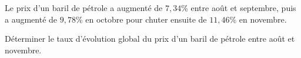\begin{exo}{}
	Le prix d'un baril de pétrole a augmenté de $7,34$\% entre août et septembre, puis a augmenté de $9,78$\% en octobre pour chuter ensuite de $11,46$\% en novembre.


	Déterminer le taux d'évolution global du prix d'un baril de pétrole entre août et novembre.
\end{exo}

